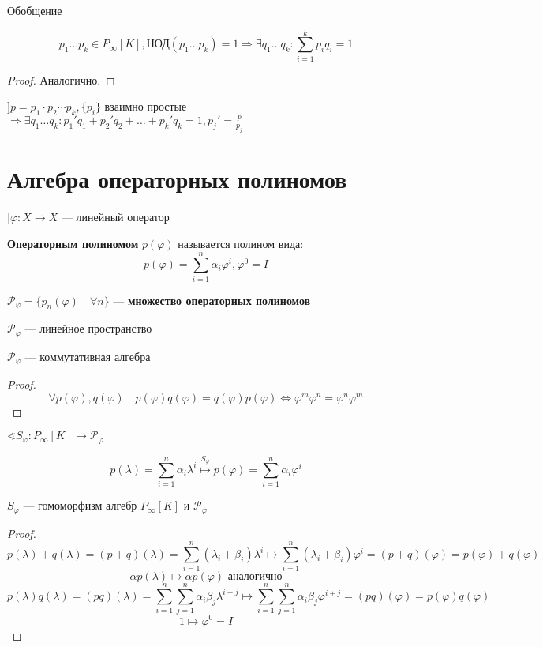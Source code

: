 \begin{theorem}
    Обобщение

    $$p_1\ldots p_k \in P_\infty[K], \text{НОД}(p_1\ldots p_k)=1\Rightarrow \exists q_1\ldots q_k : \sum_{i=1}^k p_iq_i=1$$
\end{theorem}
\begin{proof}
    Аналогично.
\end{proof}

\begin{remark}
    $] p = p_1\cdot p_2\cdots p_k, \{p_i\}$ взаимно простые $\Rightarrow \exists q_1\ldots q_k : p_1'q_1+p_2'q_2+\ldots+p_k'q_k=1, p_j'=\frac{p}{p_j}$
\end{remark}

\section*{Алгебра операторных полиномов}

$] \varphi : X\to X$ --- линейный оператор

\begin{definition}
    \textbf{Операторным полиномом} $p(\varphi)$ называется полином вида:
    $$p(\varphi)=\sum_{i=1}^n \alpha_i\varphi^i, \varphi^0=I$$
\end{definition}

\begin{definition}
    $\mathcal P_\varphi=\{p_n(\varphi)\quad \forall n\}$ --- \textbf{множество операторных полиномов}
\end{definition}

\begin{lemma}
    $\mathcal P_\varphi$ --- линейное пространство
\end{lemma}
\begin{lemma}
    $\mathcal P_\varphi$ --- коммутативная алгебра
\end{lemma}
\begin{proof}
    $$\forall p(\varphi), q(\varphi) \quad p(\varphi)q(\varphi)=q(\varphi)p(\varphi) \Leftrightarrow \varphi^m\varphi^n=\varphi^n\varphi^m$$
\end{proof}

$\sphericalangle S_\varphi : P_\infty[K] \to \mathcal P_\varphi$

$$p(\lambda)=\sum_{i=1}^n \alpha_i\lambda^i \stackrel{S_\varphi}{\mapsto} p(\varphi)=\sum_{i=1}^n \alpha_i\varphi^i$$

\begin{lemma}
    $S_\varphi$ --- гомоморфизм алгебр $P_\infty[K]$ и $\mathcal P_\varphi$
\end{lemma}
\begin{proof}
    $$p(\lambda)+q(\lambda)=(p+q)(\lambda)=\sum_{i=1}^n(\lambda_i+\beta_i)\lambda^i\mapsto \sum_{i=1}^n(\lambda_i+\beta_i)\varphi^i=(p+q)(\varphi)=p(\varphi)+q(\varphi)$$
    $$\alpha p(\lambda)\mapsto \alpha p(\varphi) \text{ аналогично}$$
    $$p(\lambda)q(\lambda)=(pq)(\lambda)=\sum_{i=1}^n\sum_{j=1}^n \alpha_i\beta_j\lambda^{i+j}\mapsto \sum_{i=1}^n\sum_{j=1}^n \alpha_i\beta_j\varphi^{i+j}=(pq)(\varphi)=p(\varphi)q(\varphi)$$
    $$1\mapsto \varphi^0=I$$
\end{proof}

